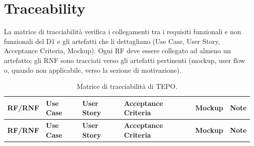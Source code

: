 \section{Traceability}

La matrice di tracciabilità verifica i collegamenti tra i requisiti funzionali e non funzionali del D1 e gli artefatti che li dettagliano (Use Case, User Story, Acceptance Criteria, Mockup). Ogni RF deve essere collegato ad almeno un artefatto; gli RNF sono tracciati verso gli artefatti pertinenti (mockup, user flow o, quando non applicabile, verso la sezione di motivazione).

\begin{longtable}{p{1.2cm} p{2.2cm} p{2.2cm} p{3.4cm} p{2.6cm} p{4cm}}
\caption{Matrice di tracciabilità di TEPO.}\\
\toprule
\textbf{RF/RNF} & \textbf{Use Case} & \textbf{User Story} & \textbf{Acceptance Criteria} & \textbf{Mockup} & \textbf{Note} \\
\midrule
\endfirsthead
\toprule
\textbf{RF/RNF} & \textbf{Use Case} & \textbf{User Story} & \textbf{Acceptance Criteria} & \textbf{Mockup} & \textbf{Note} \\
\midrule
\endhead


\end{longtable}
